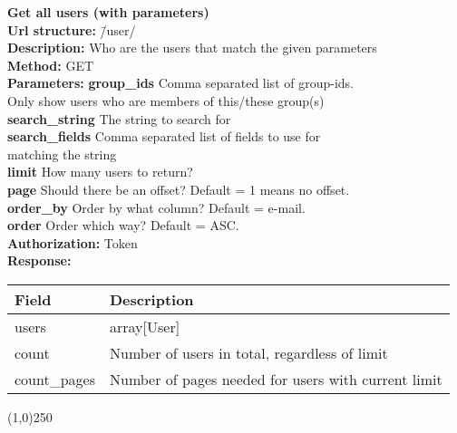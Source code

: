 \documentclass[11pt]{article}
\begin{document}
\begin{tabbing}
\textbf{Get all users (with parameters)} \\
\textcolor{black!60}{\textbf{Url structure:}} \hspace{0.2in} \= /user/ \\
\textcolor{black!60}{\textbf{Description:}}  \> Who are the users that match the given parameters \\
\textcolor{black!60}{\textbf{Method:}} \> GET \\
\textcolor{black!60}{\textbf{Parameters:}} \> \textbf{group\_ids} Comma separated list of group-ids. \\ \> Only show users who are members of this/these group(s) \\
\> \textbf{search\_string} The string to search for \\
\> \textbf{search\_fields} Comma separated list of fields to use for \\ \> matching the string \\
\> \textbf{limit} How many users to return? \\
\> \textbf{page} Should there be an offset? Default = 1 means no offset. \\
\> \textbf{order\_by} Order by what column? Default = e-mail. \\
\> \textbf{order} Order which way? Default = ASC. \\
\textcolor{black!60}{\textbf{Authorization:}} \> Token \\
\textcolor{black!60}{\textbf{Response:}} \\ \>
\begin{tabular}{|l|l|}
\hline
 Field                     &  Description                                          \\
\hline
 users                     &  array[User]                                          \\
 count                     &  Number of users in total, regardless of limit        \\
 count\_pages  &  Number of pages needed for users with current limit  \\
\hline
\end{tabular}
\end{tabbing}

\begin{center}\line(1,0){250}\end{center}
\end{document}
